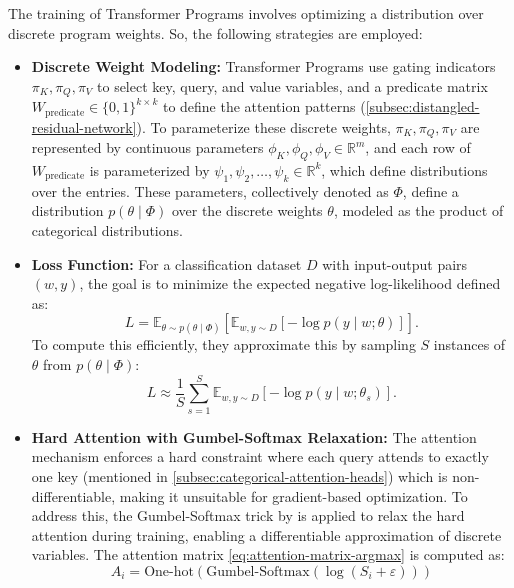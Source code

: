 The training of Transformer Programs involves optimizing a distribution over discrete program weights. So, the following strategies are employed:

\begin{itemize}
    \item \textbf{Discrete Weight Modeling:} Transformer Programs use gating indicators \( \pi_K, \pi_Q, \pi_V \) to select key, query, and value variables, and a predicate matrix \( W_{\text{predicate}} \in \{0, 1\}^{k \times k} \) to define the attention patterns (\cref{subsec:distangled-residual-network}). To parameterize these discrete weights, \( \pi_K, \pi_Q, \pi_V \) are represented by continuous parameters \( \phi_K, \phi_Q, \phi_V \in \mathbb{R}^m \), and each row of \( W_{\text{predicate}} \) is parameterized by \( \psi_1, \psi_2, \ldots, \psi_k \in \mathbb{R}^k \), which define distributions over the entries. These parameters, collectively denoted as \( \Phi \), define a distribution \( p(\theta \mid \Phi) \) over the discrete weights \( \theta \), modeled as the product of categorical distributions.
    
    \item \textbf{Loss Function:} For a classification dataset \( D \) with input-output pairs \( (w, y) \), the goal is to minimize the expected negative log-likelihood defined as:
    \begin{equation}
        L = \mathbb{E}_{\theta \sim p(\theta \mid \Phi)} \left[ \mathbb{E}_{w, y \sim D} \left[ -\log p(y \mid w; \theta) \right] \right].
    \end{equation}
    To compute this efficiently, they approximate this by sampling \( S \) instances of \( \theta \) from \( p(\theta \mid \Phi) \):
    \begin{equation}
        L \approx \frac{1}{S} \sum_{s=1}^{S} \mathbb{E}_{w, y \sim D} \left[ -\log p(y \mid w; \theta_s) \right].
    \end{equation}

    \item \textbf{Hard Attention with Gumbel-Softmax Relaxation:} The attention mechanism enforces a hard constraint where each query attends to exactly one key (mentioned in \cref{subsec:categorical-attention-heads}) which is non-differentiable, making it unsuitable for gradient-based optimization. To address this, the Gumbel-Softmax trick by \textcite{jang2016categorical} is applied to relax the hard attention during training, enabling a differentiable approximation of discrete variables. The attention matrix \cref{eq:attention-matrix-argmax} is computed as:
    \[
        A_i = \text{One-hot}\left(\text{Gumbel-Softmax}\left(\log(S_i + \varepsilon)\right)\right)
    \]
    

\end{itemize}
